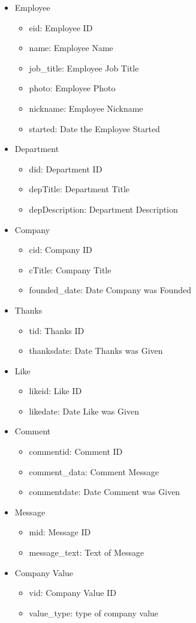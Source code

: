 \documentclass[11pt]{report}
\begin{document}
\begin{itemize}
\item Employee
    \begin{itemize}
    \item eid: Employee ID
    \item name: Employee Name
    \item job\_title: Employee Job Title
    \item photo: Employee Photo
    \item nickname: Employee Nickname
    \item started: Date the Employee Started
    \end{itemize}
\item Department
    \begin{itemize}
    \item did: Department ID
    \item depTitle: Department Title
    \item depDescription: Department Description
    \end{itemize}
\item Company
    \begin{itemize}
    \item cid: Company ID
    \item cTitle: Company Title
    \item founded\_date: Date Company was Founded
    \end{itemize}
\item Thanks
    \begin{itemize}
    \item tid: Thanks ID
    \item thanksdate: Date Thanks was Given
    \end{itemize}
\item Like
    \begin{itemize}
    \item likeid: Like ID
    \item likedate: Date Like was Given
    \end{itemize}
\item Comment
    \begin{itemize}
    \item commentid: Comment ID
    \item comment\_data: Comment Message
    \item commentdate: Date Comment was Given
    \end{itemize}
\item Message
    \begin{itemize}
    \item mid: Message ID
    \item message\_text: Text of Message
    \end{itemize}
\item Company Value
    \begin{itemize}
    \item vid: Company Value ID
    \item value\_type: type of company value
    \end{itemize}
\end{itemize}
\clearpage
\end{document}
